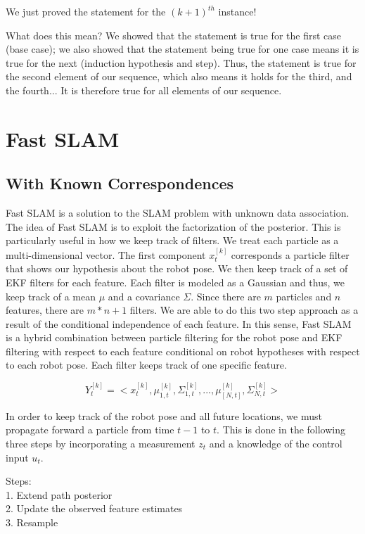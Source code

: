 \documentclass[twoside]{article}
\begin{document}
We just proved the statement for the $(k+1)^{th}$ instance!

What does this mean? We showed that the statement is true for the first case (base case); we also showed that the statement being true for one case means it is true for the next (induction hypothesis and step). Thus, the statement is true for the second element of our sequence, which also means it holds for the third, and the fourth... It is therefore true for all elements of our sequence.



\section{Fast SLAM}
\subsection{With Known Correspondences}

Fast SLAM is a solution to the SLAM problem with unknown data association. The idea of Fast SLAM is to exploit the factorization of the posterior. This is particularly useful in how we keep track of filters. We treat each particle as a multi-dimensional vector. The first component $x_t^{[k]}$ corresponds a particle filter that shows our hypothesis about the robot pose. We then keep track of a set of EKF filters for each feature. Each filter is modeled as a Gaussian and thus, we keep track of a mean $\mu$ and a covariance $\Sigma$. Since there are $m$ particles and $n$ features, there are $m*n+1$ filters. We are able to do this two step approach as a result of the conditional independence of each feature. In this sense, Fast SLAM is a hybrid combination between particle filtering for the robot pose and EKF filtering with respect to each feature conditional on robot hypotheses with respect to each robot pose. Each filter keeps track of one specific feature.

\begin{equation}
Y_t^{[k]} = <x_t^{[k]} , \mu_{1,t}^{[k]} , \Sigma_{1,t}^{[k]} , ... ,\mu_{[N,t]}^{[k]} , \Sigma_{N,t}^{[k]} >\nonumber
\end{equation}

In order to keep track of the robot pose and all future locations, we must propagate forward a particle from time $t-1$ to $t$. This is done in the following three steps by incorporating a measurement $z_{t}$ and a knowledge of the control input $u_{t}$.

Steps:
\\
\hspace*{5mm}
1. Extend path posterior
\\
\hspace*{5mm}
2. Update the observed feature estimates
\\ \hspace*{5mm}
3. Resample
\end{document}
